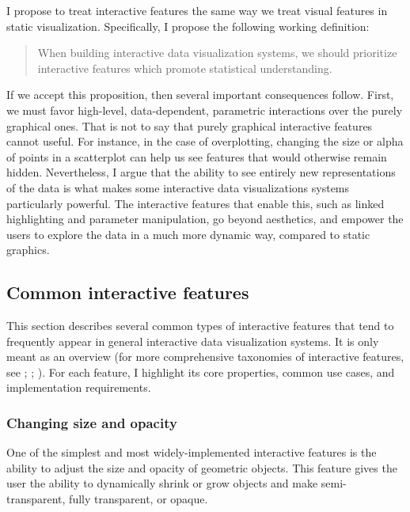\documentclass[
  openany]{book}
\theoremstyle{definition}
\theoremstyle{definition}
\theoremstyle{definition}
\theoremstyle{definition}
\theoremstyle{remark}
\begin{document}
I propose to treat interactive features the same way we treat visual features in static visualization. Specifically, I propose the following working definition:

\begin{quote}
When building interactive data visualization systems, we should prioritize interactive features which promote statistical understanding.
\end{quote}

If we accept this proposition, then several important consequences follow. First, we must favor high-level, data-dependent, parametric interactions over the purely graphical ones. That is not to say that purely graphical interactive features cannot useful. For instance, in the case of overplotting, changing the size or alpha of points in a scatterplot can help us see features that would otherwise remain hidden. Nevertheless, I argue that the ability to see entirely new representations of the data is what makes some interactive data visualizations systems particularly powerful. The interactive features that enable this, such as linked highlighting and parameter manipulation, go beyond aesthetics, and empower the users to explore the data in a much more dynamic way, compared to static graphics.

\subsection{Common interactive features}\label{common-features}

This section describes several common types of interactive features that tend to frequently appear in general interactive data visualization systems. It is only meant as an overview (for more comprehensive taxonomies of interactive features, see ; ; ). For each feature, I highlight its core properties, common use cases, and implementation requirements.

\subsubsection{Changing size and opacity}\label{changing-size-and-opacity}

One of the simplest and most widely-implemented interactive features is the ability to adjust the size and opacity of geometric objects. This feature gives the user the ability to dynamically shrink or grow objects and make semi-transparent, fully transparent, or opaque.
\end{document}
